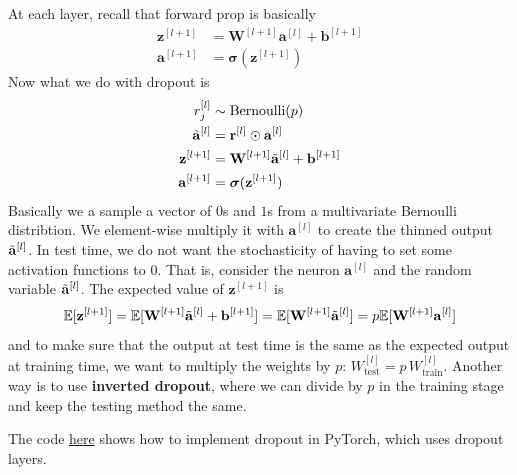 \documentclass{article}
\begin{document}
    At each layer, recall that forward prop is basically 
    \begin{align*}
        \mathbf{z}^{[l+1]} & = \mathbf{W}^{[l+1]} \mathbf{a}^{[l]} + \mathbf{b}^{[l+1]} \\
        \mathbf{a}^{[l+1]} & = \boldsymbol{\sigma} (\mathbf{z}^{[l+1]}) 
    \end{align*}
    Now what we do with dropout is 
    \begin{align*}
        r_j^{[l]} & \sim \mathrm{Bernoulli}(p) \\
        \Tilde{\mathbf{a}}^{[l]} & = \mathbf{r}^{[l]} \odot \mathbf{a}^{[l]} \\
        \mathbf{z}^{[l+1]} & = \mathbf{W}^{[l+1]} \Tilde{\mathbf{a}}^{[l]} + \mathbf{b}^{[l+1]} \\
        \mathbf{a}^{[l+1]} & = \boldsymbol{\sigma} (\mathbf{z}^{[l+1]}) 
    \end{align*}
    Basically we a sample a vector of $0$s and $1$s from a multivariate Bernoulli distribtion. We element-wise multiply it with $\mathbf{a}^{[l]}$ to create the thinned output $\Tilde{\mathbf{a}}^{[l]}$. In test time, we do not want the stochasticity of having to set some activation functions to $0$. That is, consider the neuron $\mathbf{a}^{[l]}$ and the random variable $\Tilde{\mathbf{a}}^{[l]}$. The expected value of $\mathbf{z}^{[l+1]}$ is 
    \[\mathbb{E}[\mathbf{z}^{[l+1]}] = \mathbb{E}[ \mathbf{W}^{[l+1]} \Tilde{\mathbf{a}}^{[l]} + \mathbf{b}^{[l+1]}] = \mathbb{E}[ \mathbf{W}^{[l+1]} \Tilde{\mathbf{a}}^{[l]}] = p \mathbb{E}[\mathbf{W}^{[l+1]} \mathbf{a}^{[l]}] \]
    and to make sure that the output at test time is the same as the expected output at training time, we want to multiply the weights by $p$: $W^{[l]}_{\text{test}} = p \, W^{[l]}_{\text{train}}$. Another way is to use \textbf{inverted dropout}, where we can divide by $p$ in the training stage and keep the testing method the same. 

    \begin{code} 
      The code \href{code/dropout.ipynb}{here} shows how to implement dropout in PyTorch, which uses dropout layers. 
    \end{code}
\end{document}
